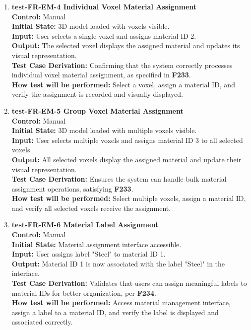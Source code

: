 \documentclass[12pt, titlepage]{article}
\begin{document}
\begin{enumerate}
  \item \textbf{test-FR-EM-4 Individual Voxel Material Assignment} \\[2mm]
    \textbf{Control:} Manual \\ 
    \textbf{Initial State:} 3D model loaded with voxels visible. \\ 
    \textbf{Input:} User selects a single voxel and assigns material ID 2. \\ 
    \textbf{Output:} The selected voxel displays the assigned material and updates its visual representation. \\[2mm]
    \textbf{Test Case Derivation:} Confirming that the system correctly processes individual voxel material assignment, as specified in \textbf{F233}. \\[2mm]
    \textbf{How test will be performed:} Select a voxel, assign a material ID, and verify the assignment is recorded and visually displayed.

  \item \textbf{test-FR-EM-5 Group Voxel Material Assignment} \\[2mm]
    \textbf{Control:} Manual \\ 
    \textbf{Initial State:} 3D model loaded with multiple voxels visible. \\ 
    \textbf{Input:} User selects multiple voxels and assigns material ID 3 to all selected voxels. \\ 
    \textbf{Output:} All selected voxels display the assigned material and update their visual representation. \\[2mm]
    \textbf{Test Case Derivation:} Ensures the system can handle bulk material assignment operations, satisfying \textbf{F233}. \\[2mm]
    \textbf{How test will be performed:} Select multiple voxels, assign a material ID, and verify all selected voxels receive the assignment.

  \item \textbf{test-FR-EM-6 Material Label Assignment} \\[2mm]
    \textbf{Control:} Manual \\ 
    \textbf{Initial State:} Material assignment interface accessible. \\ 
    \textbf{Input:} User assigns label "Steel" to material ID 1. \\ 
    \textbf{Output:} Material ID 1 is now associated with the label "Steel" in the interface. \\[2mm]
    \textbf{Test Case Derivation:} Validates that users can assign meaningful labels to material IDs for better organization, per \textbf{F234}. \\[2mm]
    \textbf{How test will be performed:} Access material management interface, assign a label to a material ID, and verify the label is displayed and associated correctly.


\end{enumerate}
\end{document}
